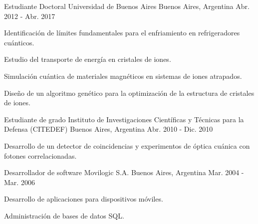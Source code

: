 \begin{cventries}
  \cventry
    {Estudiante Doctoral} %
    {Universidad de Buenos Aires} %
    {Buenos Aires, Argentina} %
    {Abr. 2012 - Abr. 2017} %
    {
      \begin{cvitems} %
        \item Identificación de límites fundamentales para el enfriamiento en refrigeradores cuánticos.
        \item Estudio del transporte de energía en cristales de iones.
        \item Simulación cuántica de materiales magnéticos en sistemas de iones atrapados.
        \item Diseño de un algoritmo genético para la optimización de la estructura de cristales de iones.
      \end{cvitems}
    }


  \cventry
    {Estudiante de grado} %
    {Instituto de Investigaciones Científicas y Técnicas para la Defensa (CITEDEF)} %
    {Buenos Aires, Argentina} %
    {Abr. 2010 - Dic. 2010} %
    {
      \begin{cvitems} %
        \item Desarrollo de un detector de coincidencias y experimentos
        de óptica cuánica con fotones correlacionadas.
      \end{cvitems}
    }

  \cventry
    {Desarrollador de software} %
    {Movilogic S.A.} %
    {Buenos Aires, Argentina} %
    {Mar. 2004 - Mar. 2006} %
    {
      \begin{cvitems}
        \item Desarrollo de aplicaciones para dispositivos móviles.
        \item Administración de bases de datos SQL.
      \end{cvitems}
    }



\end{cventries}
